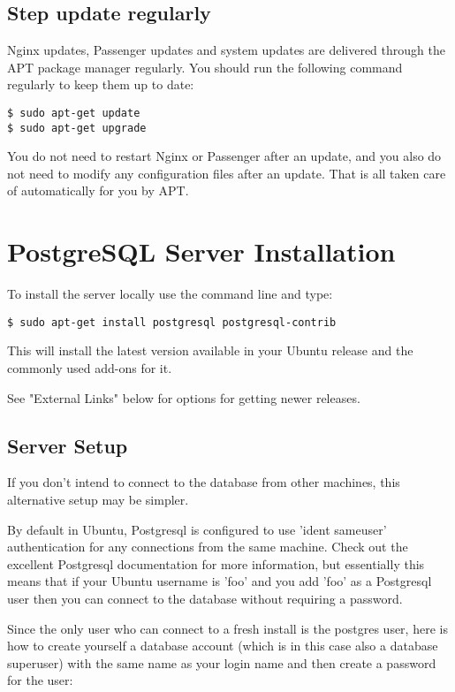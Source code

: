 \documentclass[11pt]{article}
\begin{document}
\subsection{Step update regularly}
\label{sec:orgc55d344}

Nginx updates, Passenger updates and system updates are delivered through the APT package manager regularly. You should run the following command regularly to keep them up to date:

\begin{verbatim}
$ sudo apt-get update
$ sudo apt-get upgrade
\end{verbatim}

You do not need to restart Nginx or Passenger after an update, and you also do not need to modify any configuration files after an update. That is all taken care of automatically for you by APT.

\section{PostgreSQL Server Installation}
\label{sec:org1345afc}

To install the server locally use the command line and type:

\begin{verbatim}
$ sudo apt-get install postgresql postgresql-contrib
\end{verbatim}

This will install the latest version available in your Ubuntu release and the commonly used add-ons for it.

See "External Links" below for options for getting newer releases.

\subsection{Server Setup}
\label{sec:org80f2b3c}

If you don't intend to connect to the database from other machines, this alternative setup may be simpler.

By default in Ubuntu, Postgresql is configured to use 'ident sameuser' authentication for any connections from the same machine. Check out the excellent Postgresql documentation for more information, but essentially this means that if your Ubuntu username is 'foo' and you add 'foo' as a Postgresql user then you can connect to the database without requiring a password.

Since the only user who can connect to a fresh install is the postgres user, here is how to create yourself a database account (which is in this case also a database superuser) with the same name as your login name and then create a password for the user:
\end{document}
